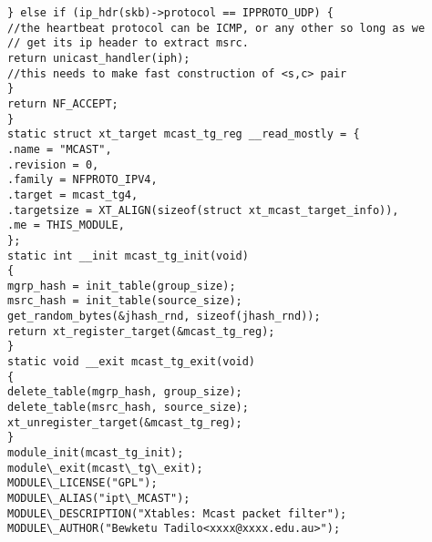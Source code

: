 \begin{verbatim}
} else if (ip_hdr(skb)->protocol == IPPROTO_UDP) {
//the heartbeat protocol can be ICMP, or any other so long as we
// get its ip header to extract msrc.
return unicast_handler(iph);
//this needs to make fast construction of <s,c> pair
}
return NF_ACCEPT;
}
static struct xt_target mcast_tg_reg __read_mostly = {
.name = "MCAST",
.revision = 0,
.family = NFPROTO_IPV4,
.target = mcast_tg4,
.targetsize = XT_ALIGN(sizeof(struct xt_mcast_target_info)),
.me = THIS_MODULE,
};
static int __init mcast_tg_init(void)
{
mgrp_hash = init_table(group_size);
msrc_hash = init_table(source_size);
get_random_bytes(&jhash_rnd, sizeof(jhash_rnd));
return xt_register_target(&mcast_tg_reg);
}
static void __exit mcast_tg_exit(void)
{
delete_table(mgrp_hash, group_size);
delete_table(msrc_hash, source_size);
xt_unregister_target(&mcast_tg_reg);
}
module_init(mcast_tg_init);
module\_exit(mcast\_tg\_exit);
MODULE\_LICENSE("GPL");
MODULE\_ALIAS("ipt\_MCAST");
MODULE\_DESCRIPTION("Xtables: Mcast packet filter");
MODULE\_AUTHOR("Bewketu Tadilo<xxxx@xxxx.edu.au>");
\end{verbatim}
